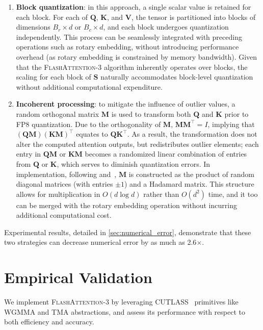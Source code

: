 \begin{enumerate}

\item \textbf{Block quantization}: in this approach, a single scalar value is retained for each block. For each of $\mathbf{Q}$, $\mathbf{K}$, and $\mathbf{V}$, the tensor is partitioned into blocks of dimensions $B_r \times d$ or $B_c \times d$, and each block undergoes quantization independently. This process can be seamlessly integrated with preceding operations such as rotary embedding, without introducing performance overhead (as rotary embedding is constrained by memory bandwidth). Given that the \textsc{FlashAttention-3} algorithm inherently operates over blocks, the scaling for each block of $\mathbf{S}$ naturally accommodates block-level quantization without additional computational expenditure.
\item \textbf{Incoherent processing}: to mitigate the influence of outlier values, a random orthogonal matrix $\mathbf{M}$ is used to transform both $\mathbf{Q}$ and $\mathbf{K}$ prior to FP8 quantization. Due to the orthogonality of $\mathbf{M}$, $\mathbf{M} \mathbf{M}^\top = I$, implying that $(\mathbf{Q} \mathbf{M}) (\mathbf{K} \mathbf{M})^\top$ equates to $\mathbf{Q} \mathbf{K}^\top$. As a result, the transformation does not alter the computed attention outputs, but redistributes outlier elements; each entry in $\mathbf{Q} \mathbf{M}$ or $\mathbf{K} \mathbf{M}$ becomes a randomized linear combination of entries from $\mathbf{Q}$ or $\mathbf{K}$, which serves to diminish quantization errors. In implementation, following \citet{chee2024quip} and~\citet{tseng2024quip}, $\mathbf{M}$ is constructed as the product of random diagonal matrices (with entries $\pm 1$) and a Hadamard matrix. This structure allows for multiplication in $O(d \log d)$ rather than $O(d^2)$ time, and it too can be merged with the rotary embedding operation without incurring additional computational cost.
\end{enumerate}

Experimental results, detailed in \cref{sec:numerical_error}, demonstrate that these two strategies can decrease numerical error by as much as 2.6$\times$.

\section{Empirical Validation}
\label{sec:exp}

We implement \textsc{FlashAttention-3} by leveraging CUTLASS~\citep{Thakkar_CUTLASS_2023} primitives like WGMMA and TMA abstractions, and assess its performance with respect to both efficiency and accuracy.

